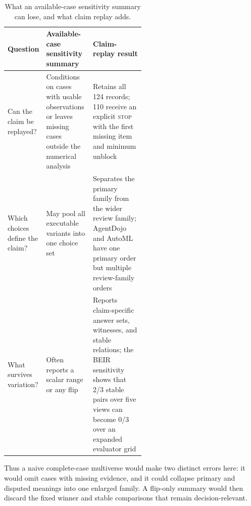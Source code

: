 \documentclass{article}
\newcommand{\STOP}{\textsc{stop}}
\begin{document}
\begin{table}[t]
\centering
\caption{What an available-case sensitivity summary can lose, and what claim replay adds.}
\label{tab:added-information}
\footnotesize
\setlength{\tabcolsep}{3pt}
\begin{tabularx}{\linewidth}{@{}p{0.20\linewidth}p{0.34\linewidth}Y@{}}
\toprule Question & Available-case sensitivity summary & Claim-replay result \\
\midrule
Can the claim be replayed? & Conditions on cases with usable observations or leaves missing cases outside the numerical analysis & Retains all 124 records; 110 receive an explicit \STOP{} with the first missing item and minimum unblock \\
Which choices define the claim? & May pool all executable variants into one choice set & Separates the primary family from the wider review family; AgentDojo and AutoML have one primary order but multiple review-family orders \\
What survives variation? & Often reports a scalar range or any flip & Reports claim-specific answer sets, witnesses, and stable relations; the BEIR sensitivity shows that 2/3 stable pairs over five views can become 0/3 over an expanded evaluator grid \\
\bottomrule
\end{tabularx}
\end{table}

Thus a naive complete-case multiverse would make two distinct errors here: it would omit cases with missing evidence, and it could collapse primary and disputed meanings into one enlarged family.  A flip-only summary would then discard the fixed winner and stable comparisons that remain decision-relevant.
\end{document}
